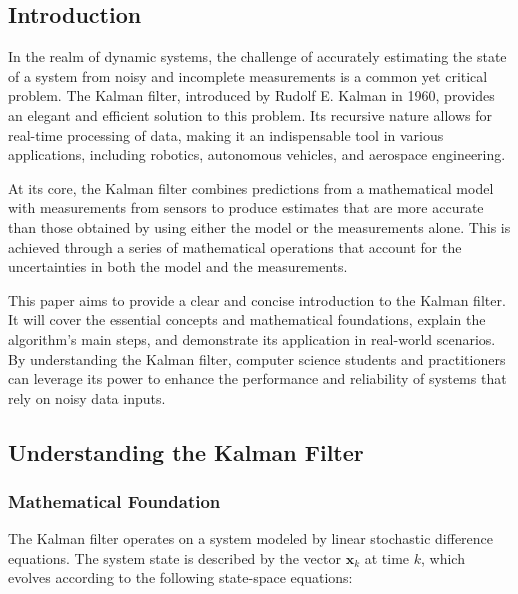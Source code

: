 \documentclass[conference]{IEEEtran}
\begin{document}
\begin{abstract}
    The Kalman filter is a recursive algorithm used for estimating the state of dynamic systems from
    noisy measurements, widely applied in fields like robotics and control systems. This paper
    offers a brief overview of the Kalman filter, covering its mathematical foundation and key
    steps: prediction and update. Practical applications, such as autonomous navigation and
    sensor fusion, are discussed to illustrate its effectiveness. By the end, readers will
    understand the basic operation and significance of the Kalman filter in computational
    applications.
\end{abstract}

\subsection{Introduction}
In the realm of dynamic systems, the challenge of accurately estimating the state of a system from
noisy and incomplete measurements is a common yet critical problem. The Kalman filter, introduced by
Rudolf E. Kalman in 1960, provides an elegant and efficient solution to this problem. Its recursive
nature allows for real-time processing of data, making it an indispensable tool in various
applications, including robotics, autonomous vehicles, and aerospace engineering.

At its core, the Kalman filter combines predictions from a mathematical model with measurements from
sensors to produce estimates that are more accurate than those obtained by using either the model or
the measurements alone. This is achieved through a series of mathematical operations that account
for the uncertainties in both the model and the measurements.

This paper aims to provide a clear and concise introduction to the Kalman filter. It will cover the
essential concepts and mathematical foundations, explain the algorithm's main steps, and demonstrate
its application in real-world scenarios. By understanding the Kalman filter, computer science
students and practitioners can leverage its power to enhance the performance and reliability of
systems that rely on noisy data inputs.

\subsection{Understanding the Kalman Filter}

\subsubsection{Mathematical Foundation}
The Kalman filter operates on a system modeled by linear stochastic difference equations. The system
state is described by the vector \( \mathbf{x}_k \) at time \( k \), which evolves according to the
following state-space equations:
\end{document}
